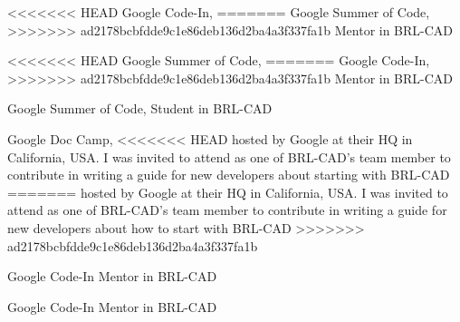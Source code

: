 <<<<<<< HEAD
    {Google Code-In,}
=======
    {Google Summer of Code,}
>>>>>>> ad2178bcbfdde9c1e86deb136d2ba4a3f337fa1b
    {}
    {Mentor in BRL-CAD}
    {}
    {}

<<<<<<< HEAD
    {Google Summer of Code,}
=======
    {Google Code-In,}
>>>>>>> ad2178bcbfdde9c1e86deb136d2ba4a3f337fa1b
    {}
    {Mentor in BRL-CAD}
    {}
    {}

    {Google Summer of Code,}
    {}
    {Student in BRL-CAD}
    {}
    {}

    {Google Doc Camp,}
    {}
<<<<<<< HEAD
    {hosted by Google at their HQ in California, USA. I was invited to attend as one of BRL-CAD's team member to contribute in writing a guide for new developers about starting with BRL-CAD}
=======
    {hosted by Google at their HQ in California, USA. I was invited to attend as one of BRL-CAD's team member to contribute in writing a guide for new developers about how to start with BRL-CAD}
>>>>>>> ad2178bcbfdde9c1e86deb136d2ba4a3f337fa1b
    {}
    {}

    {Google Code-In}
    {}
    {Mentor in BRL-CAD}
    {}
    {}

    {Google Code-In}
    {}
    {Mentor in BRL-CAD}
    {}
    {}
